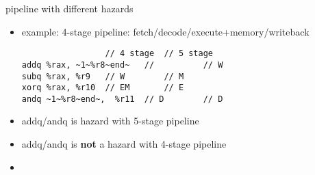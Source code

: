 \begin{frame}[fragile,label=diffHaz]{pipeline with different hazards}
    \begin{itemize}
        \item example: 4-stage pipeline: fetch/decode/execute+memory/writeback
\begin{lstlisting}
                 // 4 stage  // 5 stage
addq %rax, ~1~%r8~end~   //          // W
subq %rax, %r9   // W        // M
xorq %rax, %r10  // EM       // E
andq ~1~%r8~end~,  %r11  // D        // D
\end{lstlisting}
        \item<2> addq/andq is hazard with 5-stage pipeline
        \item<2> addq/andq is \textbf{not} a hazard with 4-stage pipeline
        \item<3> 
    \end{itemize}
\end{frame}

